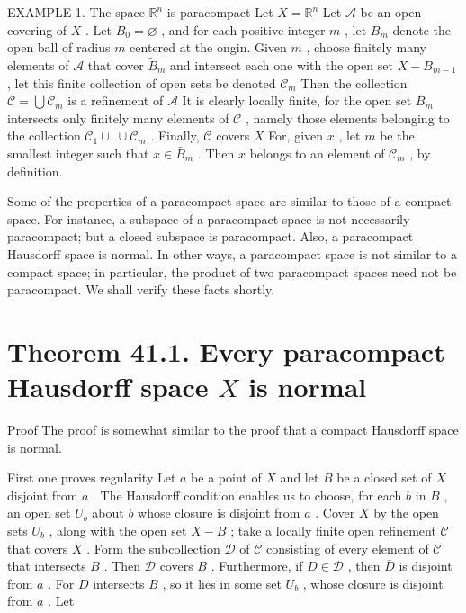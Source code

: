 EXAMPLE 1. The space \({\mathbb{R}}^{n}\) is paracompact Let \(X = {\mathbb{R}}^{n}\) Let \(\mathcal{A}\) be an open covering of \(X\) . Let \({B}_{0} = \varnothing\) , and for each positive integer \(m\) , let \({B}_{m}\) denote the open ball of radius \(m\) centered at the ongin. Given \(m\) , choose finitely many elements of \(\mathcal{A}\) that cover \({\widetilde{B}}_{m}\) and intersect each one with the open set \(X - {\bar{B}}_{m - 1}\) , let this finite collection of open sets be denoted \({\mathcal{C}}_{m}\) Then the collection \(\mathcal{C} = \bigcup {\mathcal{C}}_{m}\) is a refinement of \(\mathcal{A}\) It is clearly locally finite, for the open set \({B}_{m}\) intersects only finitely many elements of \(\mathcal{C}\) , namely those elements belonging to the collection \({\mathcal{C}}_{1} \cup  \; \cup  {\mathcal{C}}_{m}\) . Finally, \(\mathcal{C}\) covers \(X\) For, given \(x\) , let \(m\) be the smallest integer such that \(x \in  {\bar{B}}_{m}\) . Then \(x\) belongs to an element of \({\mathcal{C}}_{m}\) , by definition.

Some of the properties of a paracompact space are similar to those of a compact space. For instance, a subspace of a paracompact space is not necessarily paracompact; but a closed subspace is paracompact. Also, a paracompact Hausdorff space is normal. In other ways, a paracompact space is not similar to a compact space; in particular, the product of two paracompact spaces need not be paracompact. We shall verify these facts shortly.

\section*{Theorem 41.1. Every paracompact Hausdorff space \(X\) is normal}

Proof The proof is somewhat similar to the proof that a compact Hausdorff space is normal.

First one proves regularity Let \(a\) be a point of \(X\) and let \(B\) be a closed set of \(X\) disjoint from \(a\) . The Hausdorff condition enables us to choose, for each \(b\) in \(B\) , an open set \({U}_{b}\) about \(b\) whose closure is disjoint from \(a\) . Cover \(X\) by the open sets \({U}_{b}\) , along with the open set \(X - B\) ; take a locally finite open refinement \(\mathcal{C}\) that covers \(X\) . Form the subcollection \(\mathcal{D}\) of \(\mathcal{C}\) consisting of every element of \(\mathcal{C}\) that intersects \(B\) . Then \(\mathcal{D}\) covers \(B\) . Furthermore, if \(D \in  \mathcal{D}\) , then \(\bar{D}\) is disjoint from \(a\) . For \(D\) intersects \(B\) , so it lies in some set \({U}_{b}\) , whose closure is disjoint from \(a\) . Let

